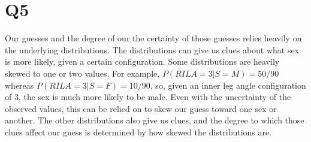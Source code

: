 \documentclass{article}
\begin{document}
\section{Q5}

Our guesses and the degree of our the certainty of those guesses relies heavily 
on the underlying distributions. The distributions can give us clues about what 
sex is more likely, given a certain configuration. Some distributions are 
heavily skewed to one or two values. For example, $P(RILA = 3 | S = M) = 50/90$ 
whereas $P(RILA = 3 | S = F) = 10/90$, so, given an inner leg angle 
configuration of 3, the sex is much more likely to be male. Even with the 
uncertainty of the observed values, this can be relied on to skew our guess 
toward one sex or another. The other distributions also give us clues, and the 
degree to which those clues affect our guess is determined by how skewed the 
distributions are.
\end{document}
